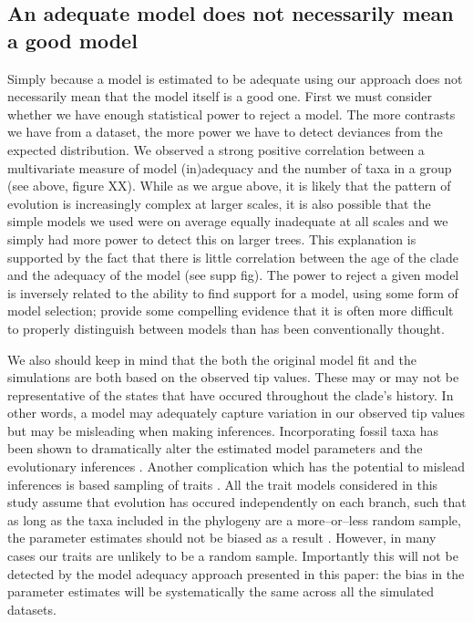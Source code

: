 \documentclass[a4paper,12pt]{article}
\begin{document}
\subsection*{An adequate model does not necessarily mean a good model}
Simply because a model is estimated to be adequate using our approach does not necessarily mean that the model itself is a good one. First we must consider whether we have enough statistical power to reject a model. The more contrasts we have from a dataset, the more power we have to detect deviances from the expected distribution. We observed a strong positive correlation between a multivariate measure of model (in)adequacy and the number of taxa in a group (see above, figure XX). While as we argue above, it is likely that the pattern of evolution is increasingly complex at larger scales, it is also possible that the simple models we used were on average equally inadequate at all scales and we simply had more power to detect this on larger trees. This explanation is supported by the fact that there is little correlation between the age of the clade and the adequacy of the model (see supp fig). The power to reject a given model is inversely related to the ability to find support for a model, using some form of model selection; \citet{Boettiger2012} provide some compelling evidence that it is often more difficult to properly distinguish between models than has been conventionally thought.

We also should keep in mind that the both the original model fit and the simulations are both based on the observed tip values. These may or may not be representative of the states that have occured throughout the clade's history. In other words, a model may adequately capture variation in our observed tip values but may be misleading when making inferences. Incorporating fossil taxa has been shown to dramatically alter the estimated model parameters and the evolutionary inferences \citep{FF2006, Slater2012Fossil, SlaterMEE}. Another complication which has the potential to mislead inferences is based sampling of traits \citep{Freckletoninaction, FitzJohnwoody}. All the trait models considered in this study assume that evolution has occured independently on each branch, such that as long as the taxa included in the phylogeny are a more--or--less random sample, the parameter estimates should not be biased as a result \citep{PennellHarmon}. However, in many cases \citep[especially when using large trait databases;][]{FitzJohnwoody} our traits are unlikely to be a random sample. Importantly this will not be detected by the model adequacy approach presented in this paper: the bias in the parameter estimates will be systematically the same across all the simulated datasets.
\end{document}
